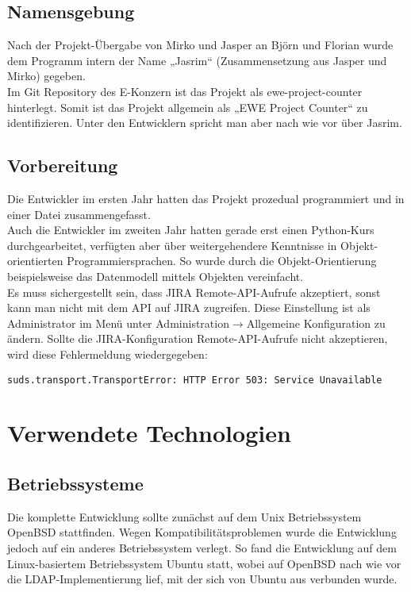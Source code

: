 \documentclass[a4paper,12pt]{report}
\begin{document}
	\section{Namensgebung}
	Nach der Projekt-Übergabe von Mirko und Jasper an Björn und Florian wurde dem Programm intern der Name „Jasrim“ (Zusammensetzung aus Jasper und Mirko) gegeben.\\
	Im Git Repository des E-Konzern ist das Projekt als ewe-project-counter hinterlegt. Somit ist das Projekt allgemein als „EWE Project Counter“ zu identifizieren. Unter den Entwicklern spricht man aber nach wie vor über Jasrim.
	
	\section{Vorbereitung}
	Die Entwickler im ersten Jahr hatten das Projekt prozedual programmiert und in einer Datei zusammengefasst.\\
	Auch die Entwickler im zweiten Jahr hatten gerade erst einen Python-Kurs durchgearbeitet, verfügten aber über weitergehendere Kenntnisse in Objekt-orientierten Programmiersprachen. So wurde durch die Objekt-Orientierung beispielsweise das Datenmodell mittels Objekten vereinfacht.\\
	Es muss sichergestellt sein, dass JIRA Remote-API-Aufrufe akzeptiert, sonst kann man nicht mit dem API auf JIRA zugreifen. Diese Einstellung ist als Administrator im Menü unter Administration$\rightarrow$Allgemeine Konfiguration zu ändern. Sollte die JIRA-Konfiguration Remote-API-Aufrufe nicht akzeptieren, wird diese Fehlermeldung wiedergegeben:
	\begin{lstlisting}
suds.transport.TransportError: HTTP Error 503: Service Unavailable
	\end{lstlisting}	
	
\chapter{Verwendete Technologien}
	\section{Betriebssysteme}	
	Die komplette Entwicklung sollte zunächst auf dem Unix Betriebssystem OpenBSD stattfinden. Wegen Kompatibilitätsproblemen wurde die Entwicklung jedoch auf ein anderes Betriebssystem verlegt. So fand die Entwicklung auf dem Linux-basiertem Betriebssystem Ubuntu statt, wobei auf OpenBSD nach wie vor die LDAP-Implementierung lief, mit der sich von Ubuntu aus verbunden wurde.
	
\end{document}
